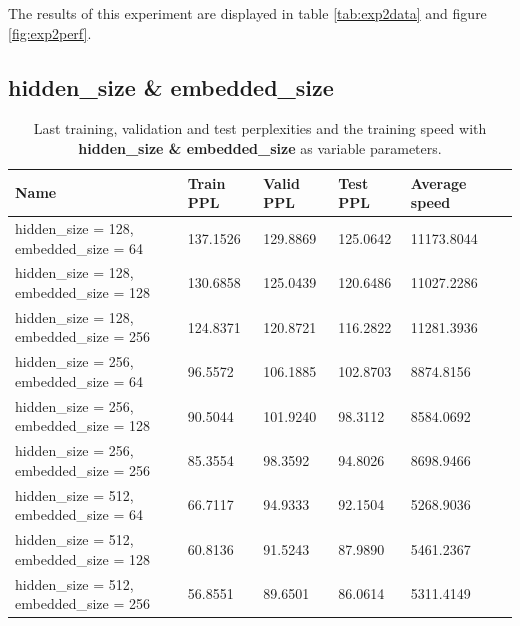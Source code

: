 \documentclass[10pt,a4paper,titlepage]{article}
\begin{document}
The results of this experiment are displayed in table \ref{tab:exp2data} and figure \ref{fig:exp2perf}.

\newpage

\subsection{hidden\_size \& embedded\_size}

\begin{table}[H]
\centering
\caption{Last training, validation and test perplexities and the training speed with \textbf{hidden\_size \& embedded\_size} as variable parameters.}
\label{tab:exp3data}
\begin{tabular}{|l|l|l|l|l|l|}
\hline
{\small Name} & {\small Train PPL} & {\small Valid PPL} & {\small Test PPL} & {\small Average speed}\\ \hline
{\small hidden\_size = 128, embedded\_size = 64  }       & 137.1526   & 129.8869   & 125.0642   & 11173.8044 \\ \hline
{\small hidden\_size = 128, embedded\_size = 128}        & 130.6858   & 125.0439   & 120.6486   & 11027.2286 \\ \hline
{\small hidden\_size = 128, embedded\_size = 256}        & 124.8371   & 120.8721   & 116.2822   & 11281.3936 \\ \hline
{\small hidden\_size = 256, embedded\_size = 64}         & 96.5572    & 106.1885   & 102.8703   & 8874.8156  \\ \hline
{\small hidden\_size = 256, embedded\_size = 128}        & 90.5044    & 101.9240   & 98.3112    & 8584.0692  \\ \hline
{\small hidden\_size = 256, embedded\_size = 256}        & 85.3554    & 98.3592    & 94.8026    & 8698.9466  \\ \hline
{\small hidden\_size = 512, embedded\_size = 64}         & 66.7117    & 94.9333    & 92.1504    & 5268.9036  \\ \hline
{\small hidden\_size = 512, embedded\_size = 128}        & 60.8136    & 91.5243    & 87.9890    & 5461.2367  \\ \hline
{\small hidden\_size = 512, embedded\_size = 256}        & 56.8551    & 89.6501    & 86.0614    & 5311.4149  \\ \hline
\end{tabular}
\end{table}
\end{document}
